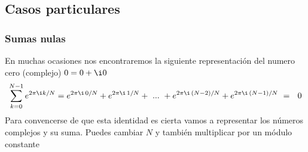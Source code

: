 \documentclass[letterpaper,10pt,english]{jupyterBook}
\begin{document}
\subsection{Casos particulares}
\label{\detokenize{docs/Part_01_Formalismo/Chapter_01_02_Formalismo_matem_xe1tico/01_01_Numeros_Complejos_myst:casos-particulares}}
\sphinxAtStartPar



\subsubsection{Sumas nulas}
\label{\detokenize{docs/Part_01_Formalismo/Chapter_01_02_Formalismo_matem_xe1tico/01_01_Numeros_Complejos_myst:sumas-nulas}}
\sphinxAtStartPar
En muchas ocasiones nos encontraremos la siguiente representación del numero cero (complejo) \(0 = 0 + \i 0\)
\begin{equation*}
\begin{split}
\sum_{k=0}^{N-1} e^{2\pi \i k/N} =   e^{2\pi \i\, 0/N} +  e^{2\pi \i\, 1/N}  +~...~ +   e^{2\pi \i\, (N-2)/N}+   e^{2\pi \i\, (N-1)/N} ~=~  ~0
 \end{split}
\end{equation*}
\sphinxAtStartPar
Para convencerse de que esta identidad es cierta vamos a representar los números complejos y su suma. Puedes cambiar \(N\) y también multiplicar por un módulo constante
\end{document}
